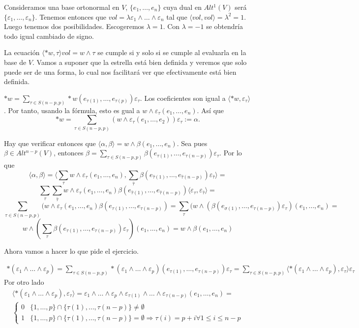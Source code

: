 \documentclass[twoside]{article}
\begin{document}
\begin{solucion}
Consideramos una base ortonormal en $V$, $\{e_1,\dots, e_n\}$ cuya dual en $Alt^1(V)$ será $\{\varepsilon_1,\dots, \varepsilon_n\}$. Tenemos entonces que $vol=\lambda\varepsilon_1\land\dots\land\varepsilon_n$ tal que $\langle vol,vol\rangle=\lambda^2=1$. Luego tenemos dos posibilidades. Escogeremos $\lambda=1$. Con $\lambda=-1$ se obtendría todo igual cambiado de signo.

La ecuación $\langle *w,\tau\rangle vol=w\land \tau$ se cumple si y solo si se cumple al evaluarla en la base de $V$. Vamos a suponer que la estrella está bien definida y veremos que solo puede ser de una forma, lo cual nos facilitará ver que efectivamente está bien definida.

$*w=\sum_{\tau\in S(n-p,p)}*w(e_{\tau(1)},\dots, e_{\tau(p)})\varepsilon_{\tau}$. Los coeficientes son igual a $\langle *w,\varepsilon_{\tau}\rangle$. Por tanto, usando la fórmula, esto es gual a $w\land\varepsilon_{\tau}(e_1,\dots, e_n)$. Así que
\[
*w=\sum_{\tau\in S(n-p,p)}(w\land\varepsilon_{\tau}(e_1,\dots, e_2))\varepsilon_{\tau}:=\alpha.
\]

Hay que verificar entonces que $\langle\alpha,\beta\rangle=w\land\beta(e_1,\dots, e_n)$. Sea pues $\beta\in Alt^{n-p}(V)$, entonces $\beta=\sum_{\tau\in S(n-p,p)}\beta(e_{\tau(1)},\dots, e_{\tau(n-p)})\varepsilon_{\tau}$. Por lo que
\[
\langle \alpha,\beta\rangle=\langle \sum_{\tau} w\land \varepsilon_{\tau}(e_1,\dots, e_n), \sum_{\hat{\tau}}\beta(e_{\hat{\tau}(1)},\dots, e_{\hat{\tau}(n-p)})\varepsilon_{\hat{\tau}}\rangle=
\]
\[
\sum_{\tau}\sum_{\hat{\tau}}w\land\varepsilon_{\tau}(e_1,\dots, e_n)\beta(e_{\hat{\tau}(1)},\dots, e_{\hat{\tau}(n-p)})\langle\varepsilon_{\tau},\varepsilon_{\hat{\tau}}\rangle=
\]
\[
\sum_{\tau\in S(n-p,p)}(w\land\varepsilon_{\tau}(e_1,\dots, e_n)\beta(e_{\tau(1)},\dots, e_{\tau(n-p)})=\sum_{\tau}(w\land(\beta(e_{\sigma(1)},\dots, e_{\tau(n-p)})\varepsilon_{\tau})(e_1,\dots, e_n)=
\]
\[
w\land(\sum_{\tau}\beta(e_{\tau(1)},\dots, e_{\tau(n-p)})\varepsilon_{\tau})(e_1,\dots, e_n)=w\land\beta(e_1,\dots, e_n)
\]

Ahora vamos a hacer lo que pide el ejercicio.

\begin{gather*}
*(\varepsilon_1\land\dots\land\varepsilon_p)=\sum_{\tau\in S(n-p,p)}*(\varepsilon_1\land\dots\land\varepsilon_p)(e_{\tau(1)},\dots, e_{\tau(n-p)})\varepsilon_{\tau}=\sum_{\tau\in S(n-p,p)}\langle *(\varepsilon_1\land\dots\land\varepsilon_p),\varepsilon_{\tau}\rangle\varepsilon_{\tau}
\end{gather*}
Por otro lado
\begin{gather*}
\langle *(\varepsilon_1\land\dots\land\varepsilon_p),\varepsilon_{\tau}\rangle=\varepsilon_1\land\dots\land\varepsilon_p\land\varepsilon_{\tau(1)}\land\dots\land\varepsilon_{\tau(n-p)}(e_1,\dots, e_n)=\\
\begin{cases}
0 & \{1,\dots, p\}\cap\{\tau(1),\dots,\tau(n-p)\}\neq\emptyset\\
1 & \{1,\dots, p\}\cap\{\tau(1),\dots,\tau(n-p)\}=\emptyset\Rightarrow \tau(i)=p+i\forall 1\leq i\leq n-p
\end{cases}
\end{gather*}


\end{solucion}
\end{document}
